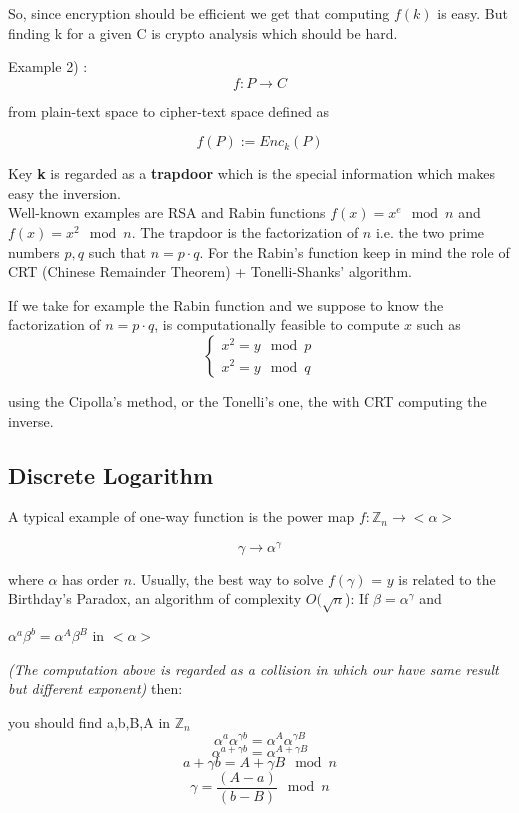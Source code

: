 \documentclass{article}
\begin{document}
So, since encryption should be efficient we get that computing \(f(k)\) is easy.  But finding k for a given C is crypto analysis which should be hard.

Example 2) :
\[f:P \xrightarrow{} C\]

from plain-text space to cipher-text space defined as

\[f(P) :=Enc_k(P)\]
 
Key \textbf{k} is regarded as a \textbf{trapdoor} which is the special information which makes easy the inversion.\\


Well-known examples are RSA and Rabin functions \(f(x) =x^e \mod n\) and \(f(x) =x^2\mod   n\). The trapdoor is the factorization of \(n\) i.e.  the two prime numbers \(p,q\) such that \(n=p·q\).  For the Rabin’s function keep in mind the role of CRT (Chinese Remainder Theorem) + Tonelli-Shanks’ algorithm.

If we take for example the Rabin function and we suppose to know the factorization of \(n = p · q\), is computationally feasible to compute \(x\) such as
\[\begin{cases} x^2 = y \mod p \\ x^2 = y \mod q \end{cases}\] 

using the Cipolla's method, or the Tonelli's one, the with CRT computing the inverse.

\subsection{Discrete Logarithm} %
\label{sub:discrete_logarithm}
A typical example of one-way function is the power map \(f : \mathbb{Z}_n \xrightarrow{} <\alpha>\)

\[\gamma \xrightarrow{} \alpha^\gamma\]

where \(\alpha\) has  order \(n\).   Usually,  the  best  way  to  solve \(f(\gamma)\)  = \(y\) is  related  to  the  Birthday’s Paradox, an algorithm of complexity \(O(\sqrt{n}\)):
If \( \beta = \alpha^\gamma\) and

\begin{center}
\(\alpha^a\beta^b=\alpha^A\beta^B\)     in \(<\alpha>\) 
\end{center}
\textit{(The computation above is regarded as a collision in which our have same result but different exponent)}
then:

you should find a,b,B,A in \(\mathbb{Z}_n\) 
\[\alpha^a \alpha^{\gamma b} = \alpha^A \alpha^{\gamma B}\]
\[\alpha^{a + \gamma b} = \alpha^{A + \gamma B}\]
\[a + \gamma b = A + \gamma B \mod n\]
\[ \gamma = \frac{(A - a)}{(b - B)} \mod n\]
\end{document}
